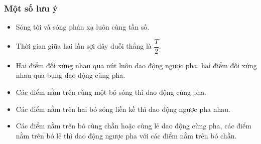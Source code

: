 \subsubsection{Một số lưu ý}
\begin{itemize}
\item Sóng tới và sóng phản xạ luôn cùng tần số.
\item Thời gian giữa hai lần sợi dây duỗi thẳng là $\dfrac{T}{2}$.
\item Hai điểm đối xứng nhau qua nút luôn dao động ngược pha, hai điểm đối xứng nhau qua bụng dao động cùng pha.
\item Các điểm nằm trên cùng một bó sóng thì dao động cùng pha.
\item Các điểm nằm trên hai bó sóng liền kề thì dao động ngược pha nhau.
\item Các điểm nằm trên bó cùng chẵn hoặc cùng lẻ dao động cùng pha, các điểm nằm trên bó lẻ thì dao động ngược pha với các điểm nằm trên bó chẵn.
\end{itemize}
\begin{center}
\end{center} 
